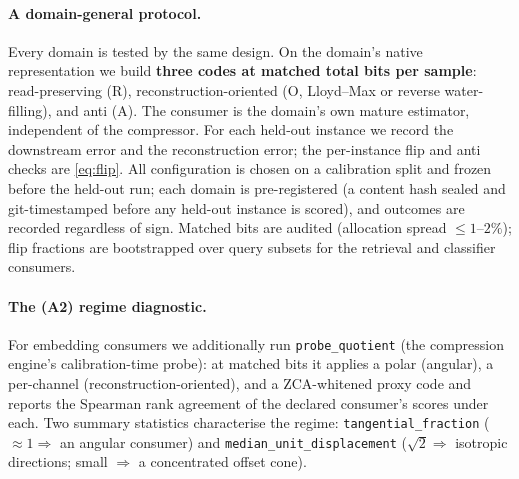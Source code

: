 \documentclass[10pt]{article} %
\theoremstyle{remark}
\begin{document}
\paragraph{A domain-general protocol.} Every domain is tested by the same design. On the
domain's native representation we build \textbf{three codes at matched total bits per
sample}: read-preserving (R), reconstruction-oriented (O, Lloyd--Max or reverse
water-filling), and anti (A). The consumer is the domain's own mature estimator,
independent of the compressor. For each held-out instance we record the downstream error
and the reconstruction error; the per-instance flip and anti checks are \eqref{eq:flip}.
All configuration is chosen on a calibration split and frozen before the held-out run;
each domain is pre-registered (a content hash sealed and git-timestamped before any
held-out instance is scored), and outcomes are recorded regardless of sign. Matched bits
are audited (allocation spread $\le1$--$2\%$); flip fractions are bootstrapped over
query subsets for the retrieval and classifier consumers.

\paragraph{The (A2) regime diagnostic.} For embedding consumers we additionally run
\texttt{probe\_quotient} (the compression engine's calibration-time probe): at matched
bits it applies a polar (angular), a per-channel (reconstruction-oriented), and a
ZCA-whitened proxy code and reports the Spearman rank agreement of the declared
consumer's scores under each. Two summary statistics characterise the regime:
\texttt{tangential\_fraction} ($\approx1\Rightarrow$ an angular consumer) and
\texttt{median\_unit\_displacement} ($\sqrt2\Rightarrow$ isotropic directions; small
$\Rightarrow$ a concentrated offset cone).
\end{document}
